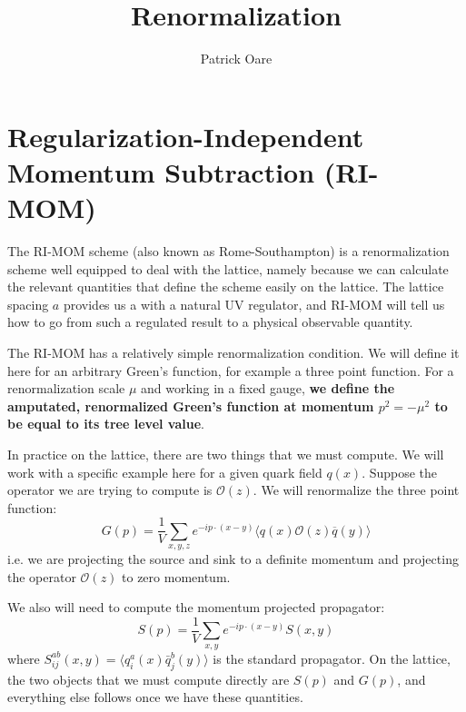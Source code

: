 \documentclass[11pt, oneside]{article}   	%
\title{Renormalization}
\author{Patrick Oare}
\date{}							%
\theoremstyle{definition}
\begin{document}
\maketitle
\section{Regularization-Independent Momentum Subtraction (RI-MOM)}

The RI-MOM scheme (also known as Rome-Southampton) is a renormalization scheme well equipped to deal with 
the lattice, namely because we can calculate the relevant quantities that define the scheme easily on the lattice. The 
lattice spacing $a$ provides us a with a natural UV regulator, and RI-MOM will tell us how to go from such a regulated 
result to a physical observable quantity. 

The RI-MOM has a relatively simple renormalization condition. We will define it here for an arbitrary Green's function, 
for example a three point function. For a renormalization scale $\mu$ and working in a fixed gauge, \textbf{we 
define the amputated, renormalized Green's function at momentum $p^2 = -\mu^2$ to be equal to its tree level 
value}. 

In practice on the lattice, there are two things that we must compute. We will work with a specific example here for a 
given quark field $q(x)$. Suppose the operator we are trying to compute is $\mathcal O(z)$. We will renormalize the 
three point function:
\begin{equation}
	G(p) = \frac{1}{V}\sum_{x, y, z}e^{-ip\cdot (x - y)}\langle q(x)\mathcal O(z) \overline{q}(y)\rangle
\end{equation}
i.e. we are projecting the source and sink to a definite momentum and projecting the operator $\mathcal O(z)$ to zero 
momentum. 

We also will need to compute the momentum projected propagator:
\begin{equation}
	S(p) = \frac{1}{V}\sum_{x, y}e^{-ip\cdot(x - y)} S(x, y)
\end{equation}
where $S^{ab}_{ij}(x, y) = \langle q^a_i(x)\bar q^b_j(y)\rangle$ is the standard propagator. On the lattice, the two objects that we must compute 
directly are $S(p)$ and $G(p)$, and everything else follows once we have these quantities. 
\end{document}
